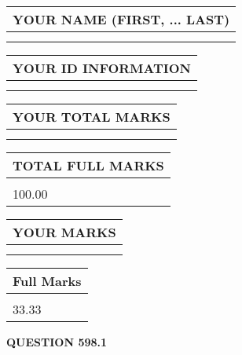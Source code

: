 \documentclass{ctexart}
\begin{document}
   
   
   
\newpage 
\setcounter{page}{ 
   598001 } 
   
   
   
   
\noindent\begin{tabular}{|l|}
\hline
YOUR NAME (FIRST, ... LAST)  \\
\hline
 \\ 
 \\ 
\hline
\end{tabular}
\hspace{0.05in} \begin{tabular}{|l|}
\hline
 YOUR   ID   INFORMATION  \\
\hline
 \\ 
 \\ 
\hline
\end{tabular}
   
   
\vspace{0.2in}\noindent\begin{tabular}{|l|}
\hline
YOUR TOTAL MARKS  \\
\hline
 \\ 
 \\ 
\hline
\end{tabular}
\hspace{0.05in} \begin{tabular}{|l|}
\hline
TOTAL FULL MARKS  \\
\hline
 \\ 
100.00 \\
\hline
\end{tabular}
   
   
 \vspace{0.2in}
 
 
 
 
   
   
  
\vspace{0.2in}
  
\noindent\begin{tabular}{|l|}
\hline
 YOUR MARKS  \\
\hline
 \\ 
 \\ 
\hline
\end{tabular}
\hspace{0.05in} \begin{tabular}{|l|}
\hline
 Full Marks  \\
\hline
 \\ 
33.33 \\
\hline
\end{tabular}
{\textbf{\Large{QUESTION
598.1 
}}}
  
\end{document}
